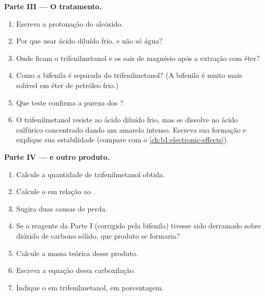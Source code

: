 \begin{problem}
\medskip
\noindent\textbf{Parte III --- O tratamento.}
\begin{enumerate}[resume]
  \item Escreva a protonação do alcóxido.
  \item Por que usar ácido diluído frio, e não só água?
  \item Onde ficam o trifenilmetanol e os sais de magnésio após a
        extração com éter?
  \item Como a bifenila é separada do trifenilmetanol? (A bifenila é muito
        mais solúvel em éter de petróleo frio.)
  \item Que teste confirma a pureza dos ?
  \item O trifenilmetanol resiste ao ácido diluído frio, mas se dissolve
        no ácido sulfúrico concentrado dando um  amarelo
        intenso. Escreva sua formação e explique sua estabilidade
        (compare com o
        \cref{ch:b1:electronic-effects}).
\end{enumerate}

\medskip
\noindent\textbf{Parte IV ---  e outro produto.}
\begin{enumerate}[resume]
  \item Calcule a quantidade de trifenilmetanol obtida.
  \item Calcule o  em relação ao .
  \item Sugira duas causas de perda.
  \item Se o reagente da Parte I (corrigido pela bifenila) tivesse sido
        derramado sobre dióxido de carbono sólido, que produto se
        formaria?
  \item Calcule a massa teórica desse produto.
  \item Escreva a equação dessa carboxilação.
  \item Indique o  em trifenilmetanol, em porcentagem.
\end{enumerate}
\end{problem}
